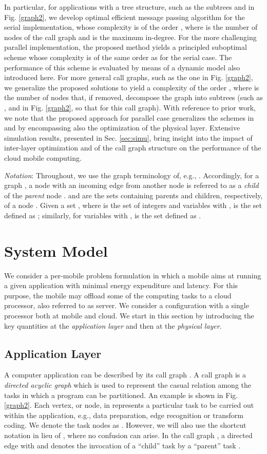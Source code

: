 \documentclass[journal,twocolumn,10pt,twoside]{IEEEtranTCOM}
\theoremstyle{plain}
\theoremstyle{plain}
\theoremstyle{remark}
\begin{document}
In particular, for applications with a tree structure, such as the subtrees  and  in Fig. \ref{graph2}, we develop optimal efficient message passing algorithm for the serial implementation, whose complexity is of the order , where  is the number of nodes of the call graph and  is the maximum in-degree. For the more challenging parallel implementation, the proposed method yields a principled suboptimal scheme whose complexity is of the same order as for the serial case. The performance of this scheme is evaluated by means of a dynamic model also introduced here. For more general call graphs, such as the one in Fig. \ref{graph2}, we generalize the proposed solutions to yield a complexity of the order , where  is the number of nodes that, if removed, decompose the graph into subtrees (such as ,  and  in Fig. \ref{graph2}, so that  for this call graph). With reference to prior work, we note that the proposed approach for parallel case generalizes the schemes in \cite{no} and \cite{hermp} by encompassing also the optimization of the physical layer. Extensive simulation results, presented in Sec. \ref{sec:simu}, bring insight into the impact of inter-layer optimization and of the call graph structure on the performance of the cloud mobile computing.


\emph{Notation}: Throughout, we use the graph terminology of, e.g., \cite{koller}. Accordingly, for a graph , a node  with an incoming edge from another node  is referred to as a \textit{child} of the \textit{parent} node .  and  are the sets containing parents and children, respectively, of a node . Given a set , where  is the set of integers and variables  with ,  is the set defined as ; similarly, for variables  with  ,  is the set defined as .
\section{System Model}
\label{sys:mod}
We consider a per-mobile problem formulation in which a mobile aims at running a given application with  minimal energy expenditure and latency. For this purpose, the mobile may offload some of the computing tasks to a cloud processor, also referred to as server. We consider a configuration with a single processor both at mobile and cloud. We start in this section by introducing the key quantities at the \textit{application layer} and then at the \textit{physical layer}.
\subsection{Application Layer}
A computer application can be described by its call graph \cite{cal}. A call graph  is a \textit{directed acyclic graph}  which is used to represent the casual relation among the tasks in which a program can be partitioned. An example is shown in Fig. \ref{graph2}. Each vertex, or node, in  represents a particular task to be carried out within the application, e.g., data preparation, edge recognition or transform coding. We denote the task nodes as . However, we will also use the shortcut notation  in lieu of , where no confusion can arise. In the call graph , a directed edge  with  and  denotes the invocation of a ``child'' task   by a ``parent'' task .
\end{document}
